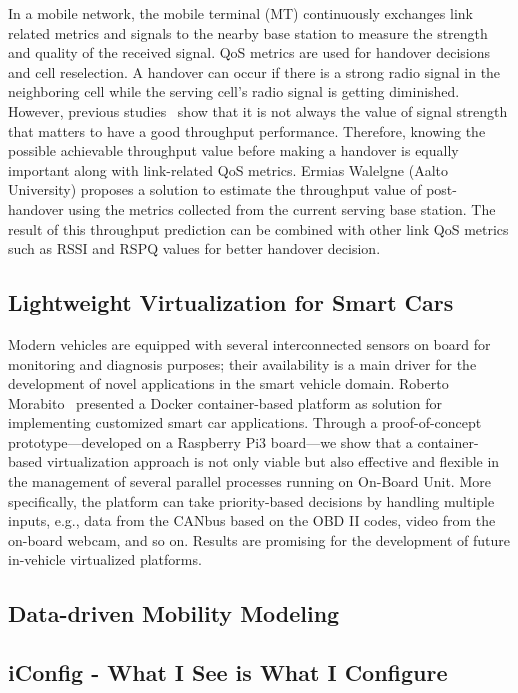 In a mobile network, the mobile terminal (MT) continuously exchanges link
related metrics and signals to the nearby base station to measure the strength
and quality of the received signal. \ac{QoS} metrics are used for handover
decisions and cell reselection.  A handover can occur if there is a strong
radio signal in the neighboring cell while the serving cell’s radio signal is
getting diminished.  However, previous studies~\cite{ssonntag:wcnc:2013} show
that it is not always the value of signal strength that matters to have a good
throughput performance.  Therefore, knowing the possible achievable throughput
value before making a handover is equally important along with link-related
\ac{QoS} metrics. Ermias Walelgne (Aalto University) proposes a solution to
estimate the throughput value of post-handover using the metrics collected
from the current serving base station. The result of this throughput
prediction can be combined with other link QoS metrics such as RSSI and RSPQ
values for better handover decision.


\subsection{Lightweight Virtualization for Smart Cars}

Modern vehicles are equipped with several interconnected sensors on board for
monitoring and diagnosis purposes; their availability is a main driver for the
development of novel applications in the smart vehicle domain. Roberto
Morabito~\cite{rmorabito:im:2017} presented a Docker container-based platform
as solution for implementing customized smart car applications. Through a
proof-of-concept prototype—developed on a Raspberry Pi3 board—we show that a
container-based virtualization approach is not only viable but also effective
and flexible in the management of several parallel processes running on
On-Board Unit. More specifically, the platform can take priority-based
decisions by handling multiple inputs, e.g., data from the CANbus based on the
OBD II codes, video from the on-board webcam, and so on. Results are promising
for the development of future in-vehicle virtualized platforms.

\subsection{Data-driven Mobility Modeling}

\subsection{iConfig - What I See is What I Configure}

